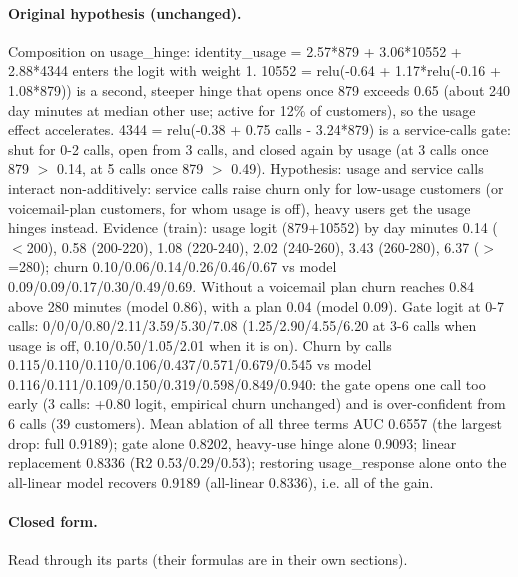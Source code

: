 \documentclass[a4paper,10pt]{article}
\newif\ifreviewmarks
\newcommand{\reviewrule}{\noindent{\color{BrickRed}\rule{\linewidth}{0.8pt}}}
\newenvironment{drafted}[1][]{%
  \ifreviewmarks\par\addvspace{\medskipamount}\reviewrule\par\nopagebreak
  \noindent{\color{BrickRed}\sffamily\footnotesize\textbf{Thesis Draft}\quad #1\hfill review}\par\nopagebreak\smallskip\fi}{%
  \ifreviewmarks\par\smallskip\noindent{\color{BrickRed}\sffamily\footnotesize end of thesis draft}\par\nopagebreak\reviewrule\par\medskip\fi}
\begin{document}
\begin{drafted}[plain-language layer: churn100-s7-c1]
\paragraph{Original hypothesis (unchanged).} Composition on usage\_\allowbreak{}hinge: identity\_\allowbreak{}usage = 2.57*879 + 3.06*10552 + 2.88*4344 enters the logit with weight 1. 10552 = relu(-0.64 + 1.17*relu(-0.16 + 1.08*879)) is a second, steeper hinge that opens once 879 exceeds 0.65 (about 240 day minutes at median other use; active for 12\% of customers), so the usage effect accelerates. 4344 = relu(-0.38 + 0.75 calls - 3.24*879) is a service-calls gate: shut for 0-2 calls, open from 3 calls, and closed again by usage (at 3 calls once 879 $>$ 0.14, at 5 calls once 879 $>$ 0.49). Hypothesis: usage and service calls interact non-additively: service calls raise churn only for low-usage customers (or voicemail-plan customers, for whom usage is off), heavy users get the usage hinges instead. Evidence (train): usage logit (879+10552) by day minutes 0.14 ($<$200), 0.58 (200-220), 1.08 (220-240), 2.02 (240-260), 3.43 (260-280), 6.37 ($>$=280); churn 0.10/\allowbreak{}0.06/\allowbreak{}0.14/\allowbreak{}0.26/\allowbreak{}0.46/\allowbreak{}0.67 vs model 0.09/\allowbreak{}0.09/\allowbreak{}0.17/\allowbreak{}0.30/\allowbreak{}0.49/\allowbreak{}0.69. Without a voicemail plan churn reaches 0.84 above 280 minutes (model 0.86), with a plan 0.04 (model 0.09). Gate logit at 0-7 calls: 0/\allowbreak{}0/\allowbreak{}0/\allowbreak{}0.80/\allowbreak{}2.11/\allowbreak{}3.59/\allowbreak{}5.30/\allowbreak{}7.08 (1.25/2.90/4.55/6.20 at 3-6 calls when usage is off, 0.10/0.50/1.05/2.01 when it is on). Churn by calls 0.115/\allowbreak{}0.110/\allowbreak{}0.110/\allowbreak{}0.106/\allowbreak{}0.437/\allowbreak{}0.571/\allowbreak{}0.679/\allowbreak{}0.545 vs model 0.116/\allowbreak{}0.111/\allowbreak{}0.109/\allowbreak{}0.150/\allowbreak{}0.319/\allowbreak{}0.598/\allowbreak{}0.849/\allowbreak{}0.940: the gate opens one call too early (3 calls: +0.80 logit, empirical churn unchanged) and is over-confident from 6 calls (39 customers). Mean ablation of all three terms AUC 0.6557 (the largest drop: full 0.9189); gate alone 0.8202, heavy-use hinge alone 0.9093; linear replacement 0.8336 (R2 0.53/0.29/0.53); restoring usage\_\allowbreak{}response alone onto the all-linear model recovers 0.9189 (all-linear 0.8336), i.e. all of the gain.
\paragraph{Closed form.} Read through its parts (their formulas are in their own sections).

\end{drafted}
\end{document}
